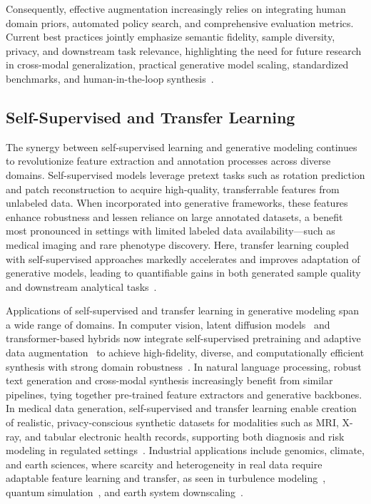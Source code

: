 \documentclass[sigconf]{acmart}
\begin{document}
Consequently, effective augmentation increasingly relies on integrating human domain priors, automated policy search, and comprehensive evaluation metrics. Current best practices jointly emphasize semantic fidelity, sample diversity, privacy, and downstream task relevance, highlighting the need for future research in cross-modal generalization, practical generative model scaling, standardized benchmarks, and human-in-the-loop synthesis~\cite{ref13,ref14,ref64}.

\subsection{Self-Supervised and Transfer Learning}

The synergy between self-supervised learning and generative modeling continues to revolutionize feature extraction and annotation processes across diverse domains. Self-supervised models leverage pretext tasks such as rotation prediction and patch reconstruction to acquire high-quality, transferrable features from unlabeled data. When incorporated into generative frameworks, these features enhance robustness and lessen reliance on large annotated datasets, a benefit most pronounced in settings with limited labeled data availability—such as medical imaging and rare phenotype discovery. Here, transfer learning coupled with self-supervised approaches markedly accelerates and improves adaptation of generative models, leading to quantifiable gains in both generated sample quality and downstream analytical tasks~\cite{ref79}.

Applications of self-supervised and transfer learning in generative modeling span a wide range of domains. In computer vision, latent diffusion models~\cite{ref100,ref102} and transformer-based hybrids now integrate self-supervised pretraining and adaptive data augmentation~\cite{ref54,ref55,ref61,ref64,ref66} to achieve high-fidelity, diverse, and computationally efficient synthesis with strong domain robustness~\cite{ref79,ref100,ref101,ref102}. In natural language processing, robust text generation and cross-modal synthesis increasingly benefit from similar pipelines, tying together pre-trained feature extractors and generative backbones. In medical data generation, self-supervised and transfer learning enable creation of realistic, privacy-conscious synthetic datasets for modalities such as MRI, X-ray, and tabular electronic health records, supporting both diagnosis and risk modeling in regulated settings~\cite{ref1,ref2,ref3,ref12,ref13,ref14,ref60,ref81,ref89,ref91}. Industrial applications include genomics, climate, and earth sciences, where scarcity and heterogeneity in real data require adaptable feature learning and transfer, as seen in turbulence modeling~\cite{ref15}, quantum simulation~\cite{ref16}, and earth system downscaling~\cite{ref73}.
\end{document}
